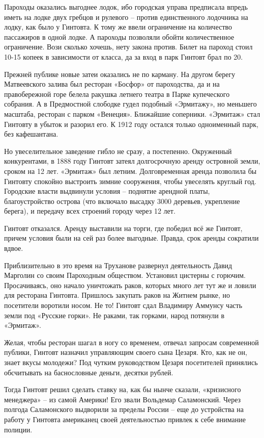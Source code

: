 Пароходы оказались выгоднее лодок, ибо городская управа предписала впредь иметь на лодке двух гребцов и рулевого – против единственного лодочника на лодку, как было у Гинтовта. К тому же ввели ограничение на количество пассажиров в одной лодке. А пароходы позволяли обойти количественное ограничение. Вози сколько хочешь, нету закона против. Билет на пароход стоил 10-15 копеек в зависимости от класса, да за вход в парк Гинтовт брал по 20.

Прежней публике новые затеи оказались не по карману. На другом берегу Матвеевского залива был ресторан «Босфор» от пароходства, да и на правобережной горе белела ракушка летнего театра в Парке купеческого собрания. А в Предмостной слободке гудел подобный «Эрмитажу», но меньшего масштаба, ресторан с парком «Венеция». Ближайшие соперники. «Эрмитаж» стал Гинтовту в убыток и разорил его. К 1912 году остался только одноименный парк, без кафешантана.

Но увеселительное заведение гибло не сразу, а постепенно. Окруженный конкурентами, в 1888 году Гинтовт затеял долгосрочную аренду островной земли, сроком на 12 лет. «Эрмитаж» был летним. Долговременная аренда позволила бы Гинтовту спокойно выстроить зимние сооружения, чтобы увеселять круглый год. Городские власти выдвинули условия – поднятие арендной платы, благоустройство острова (что включало высадку 3000 деревьев, укрепление берега), и передачу всех строений городу через 12 лет.

Гинтовт отказался. Аренду выставили на торги, где победил всё же Гинтовт, причем условия были на сей раз более выгодные. Правда, срок аренды сократили вдвое.

Приблизительно в это время на Труханове развернул деятельность Давид Марголин со своим Пароходным обществом. Установил цистерны с горючим. Просачиваясь, оно начало уничтожать раков, которых много лет тут же и ловили для ресторана Гинтовта. Пришлось закупать раков на Житнем рынке, но посетители воротили носом. Не то! Гинтовт сдал Владимиру Аммунсу часть земли под «Русские горки». Не раками, так горками, народ потянули в «Эрмитаж».

Желая, чтобы ресторан шагал в ногу со временем, отвечал запросам современной публики, Гинтовт назначил управляющим своего сына Цезаря. Кто, как не он, знает вкусы молодежи? Под чутким руководством Цезаря посетителей принялись обсчитывать на баснословные деньги, десятки рублей.

Тогда Гинтовт решил сделать ставку на, как бы нынче сказали, «кризисного менеджера» – из самой Америки! Его звали Вольдемар Саламонский. Через полгода Саламонского выдворили за пределы России – еще до устройства на работу у Гинтовта американец своей деятельностью привлек к себе внимание полиции.


